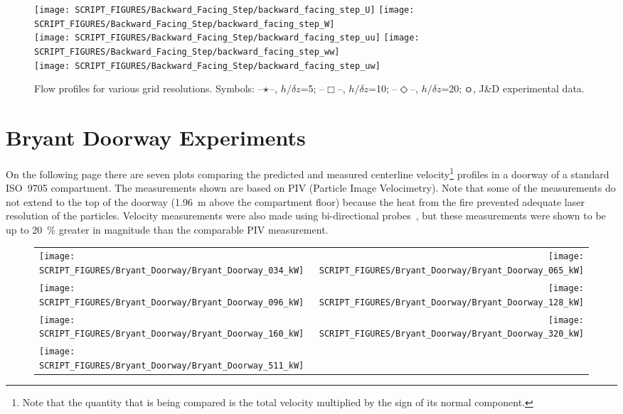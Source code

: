 \begin{figure}[!htb]
    \centering
    \texttt{[image: SCRIPT\_FIGURES/Backward\_Facing\_Step/backward\_facing\_step\_U]}
    \texttt{[image: SCRIPT\_FIGURES/Backward\_Facing\_Step/backward\_facing\_step\_W]}\\
    \texttt{[image: SCRIPT\_FIGURES/Backward\_Facing\_Step/backward\_facing\_step\_uu]}
    \texttt{[image: SCRIPT\_FIGURES/Backward\_Facing\_Step/backward\_facing\_step\_ww]}\\
    \texttt{[image: SCRIPT\_FIGURES/Backward\_Facing\_Step/backward\_facing\_step\_uw]}
    \caption[Flow profiles]{Flow profiles for various grid resolutions.  Symbols: --$\mathlarger{\mathlarger{\star}}$--, $h/\delta z$=5; --$\Box$--, $h/\delta z$=10; --$\Diamond$--, $h/\delta z$=20; $\mathlarger{\mathlarger{\boldsymbol\circ}}$, J\&D experimental data.}
    \label{fig:flow_profiles}
\end{figure}


\clearpage

\section{Bryant Doorway Experiments}

On the following page there are seven plots comparing the predicted and measured centerline velocity\footnote{Note that the quantity that is being compared is the total velocity multiplied by the sign of its normal component.} profiles in a doorway of a standard ISO~9705 compartment. The measurements shown are based on PIV (Particle Image Velocimetry). Note that some of the measurements do not extend to the top of the doorway (1.96~m above the compartment floor) because the heat from the fire prevented adequate laser resolution of the particles. Velocity measurements were also made using bi-directional probes~\cite{Bryant:FSJ2009}, but these measurements were shown to be up to 20~\% greater in magnitude than the comparable PIV measurement.



\begin{figure}[p]
\begin{tabular*}{\textwidth}{l@{\extracolsep{\fill}}r}
\texttt{[image: SCRIPT\_FIGURES/Bryant\_Doorway/Bryant\_Doorway\_034\_kW]} &
\texttt{[image: SCRIPT\_FIGURES/Bryant\_Doorway/Bryant\_Doorway\_065\_kW]} \\
\texttt{[image: SCRIPT\_FIGURES/Bryant\_Doorway/Bryant\_Doorway\_096\_kW]} &
\texttt{[image: SCRIPT\_FIGURES/Bryant\_Doorway/Bryant\_Doorway\_128\_kW]} \\
\texttt{[image: SCRIPT\_FIGURES/Bryant\_Doorway/Bryant\_Doorway\_160\_kW]} &
\texttt{[image: SCRIPT\_FIGURES/Bryant\_Doorway/Bryant\_Doorway\_320\_kW]} \\
\texttt{[image: SCRIPT\_FIGURES/Bryant\_Doorway/Bryant\_Doorway\_511\_kW]} &
\end{tabular*}
\label{Bryant_Doorway}
\end{figure}


